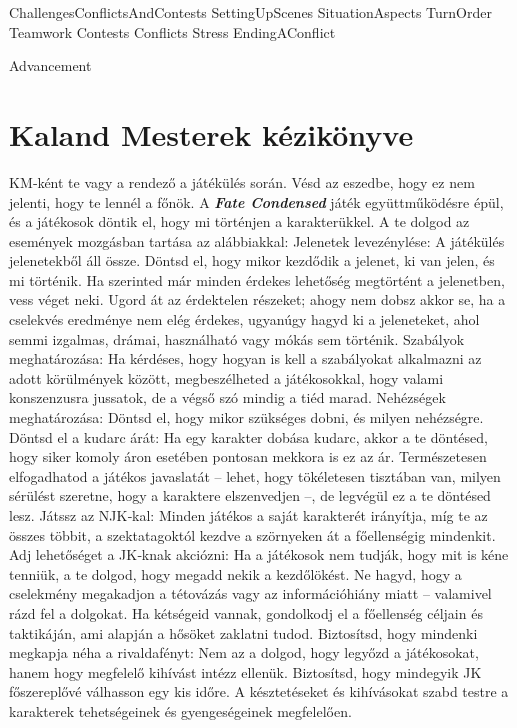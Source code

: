 \documentclass[oneside]{book}
\newcommand{\fate}[1]{\textbf{\textit{#1}}}
\begin{document}
 {ChallengesConflictsAndContests}
 {SettingUpScenes}
 {SituationAspects}
 {TurnOrder}
 {Teamwork}
 {Contests}
 {Conflicts}
 {Stress}
 {EndingAConflict}

 {Advancement}

\chapter{Kaland Mesterek kézikönyve}
KM‑ként te vagy a rendező a játékülés során. Vésd az eszedbe, hogy ez nem jelenti, hogy te lennél a főnök. A \fate{Fate Condensed} játék együttműködésre épül, és a játékosok döntik el, hogy mi történjen a karakterükkel. A te dolgod az események mozgásban tartása az alábbiakkal:
Jelenetek levezénylése: A játékülés jelenetekből áll össze. Döntsd el, hogy mikor kezdődik a jelenet, ki van jelen, és mi történik. Ha szerinted már minden érdekes lehetőség megtörtént a jelenetben, vess véget neki. Ugord át az érdektelen részeket; ahogy nem dobsz akkor se, ha a cselekvés eredménye nem elég érdekes, ugyanúgy hagyd ki a jeleneteket, ahol semmi izgalmas, drámai, használható vagy mókás sem történik.
Szabályok meghatározása: Ha kérdéses, hogy hogyan is kell a szabályokat alkalmazni az adott körülmények között, megbeszélheted a játékosokkal, hogy valami konszenzusra jussatok, de a végső szó mindig a tiéd marad.
Nehézségek meghatározása: Döntsd el, hogy mikor szükséges dobni, és milyen nehézségre.
Döntsd el a kudarc árát: Ha egy karakter dobása kudarc, akkor a te döntésed, hogy siker komoly áron esetében pontosan mekkora is ez az ár. Természetesen elfogadhatod a játékos javaslatát – lehet, hogy tökéletesen tisztában van, milyen sérülést szeretne, hogy a karaktere elszenvedjen –, de legvégül ez a te döntésed lesz.
Játssz az NJK‑kal: Minden játékos a saját karakterét irányítja, míg te az összes többit, a szektatagoktól kezdve a szörnyeken át a főellenségig mindenkit.
Adj lehetőséget a JK‑knak akciózni: Ha a játékosok nem tudják, hogy mit is kéne tenniük, a te dolgod, hogy megadd nekik a kezdőlökést. Ne hagyd, hogy a cselekmény megakadjon a tétovázás vagy az információhiány miatt – valamivel rázd fel a dolgokat. Ha kétségeid vannak, gondolkodj el a főellenség  céljain és taktikáján, ami alapján a hősöket zaklatni tudod.
Biztosítsd, hogy mindenki megkapja néha a rivaldafényt: Nem az a dolgod, hogy legyőzd a játékosokat, hanem hogy megfelelő kihívást intézz ellenük. Biztosítsd, hogy mindegyik JK főszereplővé válhasson egy kis időre. A késztetéseket és kihívásokat szabd testre a karakterek tehetségeinek és gyengeségeinek megfelelően.
\end{document}
